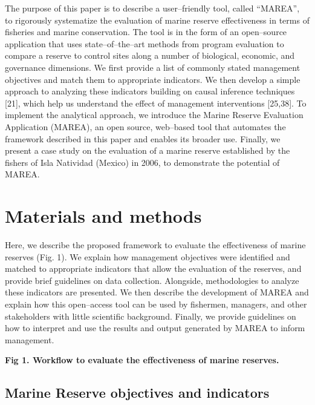 \documentclass[12pt,]{article}
\begin{document}
The purpose of this paper is to describe a user--friendly tool, called
``MAREA'', to rigorously systematize the evaluation of marine reserve
effectiveness in terms of fisheries and marine conservation. The tool is
in the form of an open--source application that uses state--of--the--art
methods from program evaluation to compare a reserve to control sites
along a number of biological, economic, and governance dimensions. We
first provide a list of commonly stated management objectives and match
them to appropriate indicators. We then develop a simple approach to
analyzing these indicators building on causal inference techniques
{[}21{]}, which help us understand the effect of management
interventions {[}25,38{]}. To implement the analytical approach, we
introduce the Marine Reserve Evaluation Application (MAREA), an open
source, web--based tool that automates the framework described in this
paper and enables its broader use. Finally, we present a case study on
the evaluation of a marine reserve established by the fishers of Isla
Natividad (Mexico) in 2006, to demonstrate the potential of MAREA.

\section{Materials and methods}\label{materials-and-methods}

Here, we describe the proposed framework to evaluate the effectiveness
of marine reserves (Fig. 1). We explain how management objectives were
identified and matched to appropriate indicators that allow the
evaluation of the reserves, and provide brief guidelines on data
collection. Alongside, methodologies to analyze these indicators are
presented. We then describe the development of MAREA and explain how
this open--access tool can be used by fishermen, managers, and other
stakeholders with little scientific background. Finally, we provide
guidelines on how to interpret and use the results and output generated
by MAREA to inform management.

\textbf{Fig 1. Workflow to evaluate the effectiveness of marine
reserves.}

\subsection{Marine Reserve objectives and
indicators}\label{marine-reserve-objectives-and-indicators}
\end{document}
